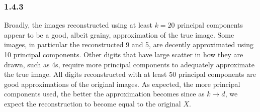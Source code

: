 \documentclass[12pt]{amsart}
\begin{document}
\subsubsection*{1.4.3}

Broadly, the images reconstructed using at least $k = 20$ principal components appear to be a good, albeit grainy, approximation of the true image.  Some images, in particular the reconstructed 9 and 5, are decently approximated using 10 principal components.  Other digits that have large scatter in how they are drawn, such as 4s, require more principal components to adequately approximate the true image.  All digits reconstructed with at least 50 principal components are good approximations of the original images.  As expected, the more principal components used, the better the approximation becomes since as $k \rightarrow d$, we expect the reconstruction to become equal to the original $X$.
\end{document}
